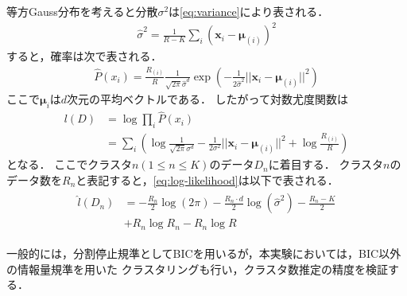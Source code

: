 等方Gauss分布を考えると分散$\sigma^2$は\eqref{eq:variance}により表される．
\begin{align}
  \label{eq:variance}
  \hat{\sigma}^2 = \frac{1}{R-K}\sum_i\left({\bm x}_i-{\bm \mu}_{(i)}\right)^2
\end{align}
すると，確率は次で表される．
\begin{align}
  \label{eq:gaussian-distribution}
  \hat{P}(x_i) = \frac{R_{(i)}}{R}\frac{1}{\sqrt{2\pi}\hat{\sigma}^d}
    \exp\left(-\frac{1}{2\hat{\sigma}^2}||{\bm x}_i-{\bm \mu}_{(i)}||^2\right)
\end{align}
ここで${\bm \mu}_{i}$は$d$次元の平均ベクトルである．
したがって対数尤度関数は
\begin{align}
  \label{eq:log-likelihood}
  l(D) &= \log \prod_i \hat{P}(x_i) \\\nonumber
  &= \sum_i \left( \log\frac{1}{\sqrt{2\pi}\sigma^d}-\frac{1}{2\sigma^2}||{\bm x}_i-{\bm \mu}_{(i)}||^2 + \log\frac{R_{(i)}}{R} \right)
\end{align}
となる．
ここでクラスタ$n (1 \leq n \leq K)$のデータ$D_n$に着目する．
クラスタ$n$のデータ数を$R_n$と表記すると，\eqref{eq:log-likelihood}は以下で表される．
\begin{align}
  \begin{split}
    \hat{l}(D_n) &= -\frac{R_n}{2}\log(2\pi) - \frac{R_n \cdot d}{2}\log(\hat{\sigma}^2) -
    \frac{R_n - K}{2}\\ &
    + R_n\log R_n - R_n \log R
  \end{split}
\end{align}

一般的には，分割停止規準としてBICを用いるが，本実験においては，BIC以外の情報量規準を用いた
クラスタリングも行い，クラスタ数推定の精度を検証する．
